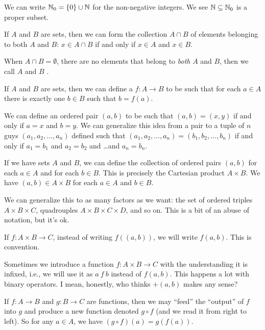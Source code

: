 \begin{example}
We can write $\mathbb{N}_{0}=\{0\}\cup\mathbb{N}$ for the non-negative integers. We
see $\mathbb{N}\subseteq\mathbb{N}_{0}$ is a proper subset.
\end{example}

If $A$ and $B$ are sets, then we can form the collection $A\cap B$ of elements
belonging to both $A$ and $B$: $x\in A\cap B$ if and only if $x\in A$
and $x\in B$.

When $A\cap B=\emptyset$, there are no elements that belong to
\emph{both} $A$ and $B$, then we call $A$ and $B$ .

If $A$ and $B$ are sets, then we can define a 
$f\colon A\to B$ to be such that for each $a\in A$ there is exactly one
$b\in B$ such that $b=f(a)$.

We can define an ordered pair $(a,b)$ to be such that $(a,b)=(x,y)$ if
and only if $a=x$ and $b=y$. We can generalize this idea from a pair to
a tuple of $n$ guys $(a_{1}, a_{2}, \dots, a_{n})$ defined such that
$(a_{1},a_{2},\dots,a_{n})=(b_{1},b_{2},\dots,b_{n})$ if and only if
$a_{1}=b_{1}$ and $a_{2}=b_{2}$ and \dots and $a_{n}=b_{n}$.

If we have sets $A$ and $B$, we can define the collection of ordered
pairs $(a,b)$ for each $a\in A$ and for each $b\in B$. This is precisely
the Cartesian product $A\times B$. We have $(a,b)\in A\times B$ for each
$a\in A$ and $b\in B$.

We can generalize this to as many factors as we want: the set of ordered triples
$A\times B\times C$, quadrouples $A\times B\times C\times D$, and so
on. This is a bit of an abuse of notation, but it's ok.

If $f\colon A\times B\to C$, instead of writing $f((a,b))$, we will
write $f(a,b)$. This is convention.

Sometimes we introduce a function $f\colon A\times B\to C$ with the
understanding it is infixed, i.e., we will use it as $a~f~b$ instead of
$f(a,b)$. This happens a lot with binary operators. I mean, honestly,
who thinks $+(a,b)$ makes any sense?

 If $f\colon A\to B$ and $g\colon B\to C$ are
functions, then we may ``feed'' the ``output'' of $f$ into $g$ and
produce a new function denoted $g\circ f$ (and we read it from right to left).
So for any $a\in A$, we have $(g\circ f)(a) = g\left(f(a)\right)$.

